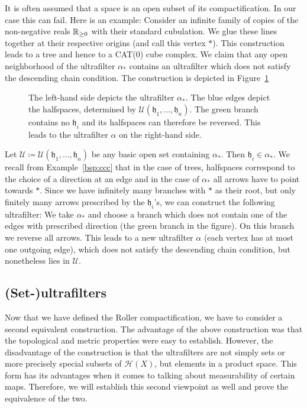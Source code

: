 \begin{rem}
  It is often assumed that a space is an open subset of its compactification. In our case this can fail. Here is an example: Consider an infinite family of copies of the non-negative reals \(\mathbb{R}_{\geq0}\) with their standard cubulation. We glue these lines together at their respective origins (and call this vertex \(\ast\)). This construction leads to a tree and hence to a CAT(0) cube complex. We claim that any open neighborhood of the ultrafilter \(\alpha_\ast\) contains an ultrafilter which does not satisfy the descending chain condition. The construction is depicted in Figure~\ref{fig:roller-counterexample}
  \begin{figure}[htbp]
    \centering
    
    \caption{The left-hand side depicts the ultrafilter \(\alpha_\ast\). The blue edges depict the halfspaces, determined by \(\mathcal{U}(\mathfrak{h}_1, \dots, \mathfrak{h}_n)\). The green branch contains no \(\mathfrak{h}_i\) and its halfspaces can therefore be reversed. This leads to the ultrafilter \(\alpha\) on the right-hand side.}
    \label{fig:roller-counterexample}
  \end{figure}

  Let \(\mathcal{U} \coloneqq \mathcal{U}(\mathfrak{h}_1, \dots, \mathfrak{h}_n)\) be any basic open set containing \(\alpha_\ast\). Then \(\mathfrak{h}_i \in \alpha_\ast\). We recall from Example~\ref{bsp:ccc} that in the case of trees, halfspaces correspond to the choice of a direction at an edge and in the case of \(\alpha_\ast\) all arrows have to point towards \(\ast\). Since we have infinitely many branches with \(\ast\) as their root, but only finitely many arrows prescribed by the \(\mathfrak{h}_i\)'s, we can construct the following ultrafilter: We take \(\alpha_\ast\) and choose a branch which does not contain one of the edges with prescribed direction (the green branch in the figure). On this branch we reverse all arrows. This leads to a new ultrafilter \(\alpha\) (each vertex has at most one outgoing edge), which does not satisfy the descending chain condition, but nonetheless lies in \(\mathcal{U}\).
\end{rem}

\subsection{(Set-)ultrafilters}
\label{sec:set-ultrafilters}

Now that we have defined the Roller compactification, we have to consider a second equivalent construction. The advantage of the above construction was that the topological and metric properties were easy to establish. However, the disadvantage of the construction is that the ultrafilters are not simply sets or more precisely special subsets of \(\mathcal{H}(X)\), but elements in a product space. This form has its advantages when it comes to talking about measurability of certain maps. Therefore, we will establish this second viewpoint as well and prove the equivalence of the two.

